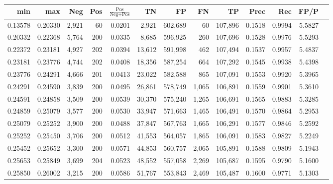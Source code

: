 \begin{tabular}{rrrrrrrrrrrrr}
\toprule
    min &     max &   Neg & Pos & $\frac{\text{Pos}}{\text{Neg}+\text{Pos}}$ &      TN &      FP &      FN &      TP &   Prec &    Rec &   FP/P \\
\midrule
0.13578 & 0.20330 & 2,921 &  60 &                                     0.0201 &   2,921 & 602,689 &      60 & 107,896 & 0.1518 & 0.9994 & 5.5827 \\
0.20332 & 0.22368 & 5,764 & 200 &                                     0.0335 &   8,685 & 596,925 &     260 & 107,696 & 0.1528 & 0.9976 & 5.5293 \\
0.22372 & 0.23181 & 4,927 & 202 &                                     0.0394 &  13,612 & 591,998 &     462 & 107,494 & 0.1537 & 0.9957 & 5.4837 \\
0.23181 & 0.23776 & 4,744 & 202 &                                     0.0408 &  18,356 & 587,254 &     664 & 107,292 & 0.1545 & 0.9938 & 5.4398 \\
0.23776 & 0.24291 & 4,666 & 201 &                                     0.0413 &  23,022 & 582,588 &     865 & 107,091 & 0.1553 & 0.9920 & 5.3965 \\
0.24291 & 0.24590 & 3,839 & 200 &                                     0.0495 &  26,861 & 578,749 &   1,065 & 106,891 & 0.1559 & 0.9901 & 5.3610 \\
0.24591 & 0.24858 & 3,509 & 200 &                                     0.0539 &  30,370 & 575,240 &   1,265 & 106,691 & 0.1565 & 0.9883 & 5.3285 \\
0.24859 & 0.25079 & 3,577 & 200 &                                     0.0530 &  33,947 & 571,663 &   1,465 & 106,491 & 0.1570 & 0.9864 & 5.2953 \\
0.25079 & 0.25252 & 3,900 & 200 &                                     0.0488 &  37,847 & 567,763 &   1,665 & 106,291 & 0.1577 & 0.9846 & 5.2592 \\
0.25252 & 0.25450 & 3,706 & 200 &                                     0.0512 &  41,553 & 564,057 &   1,865 & 106,091 & 0.1583 & 0.9827 & 5.2249 \\
0.25452 & 0.25652 & 3,300 & 200 &                                     0.0571 &  44,853 & 560,757 &   2,065 & 105,891 & 0.1588 & 0.9809 & 5.1943 \\
0.25653 & 0.25849 & 3,699 & 204 &                                     0.0523 &  48,552 & 557,058 &   2,269 & 105,687 & 0.1595 & 0.9790 & 5.1600 \\
0.25850 & 0.26002 & 3,215 & 200 &                                     0.0586 &  51,767 & 553,843 &   2,469 & 105,487 & 0.1600 & 0.9771 & 5.1303 \\

\end{tabular}
